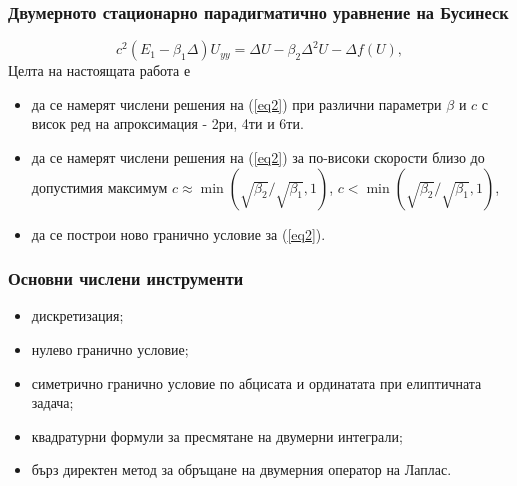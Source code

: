 \documentclass{beamer}
\newcommand{\rf}[1]{(\ref{#1})}
\begin{document}
\begin{frame}
\frametitle{ Двумерното стационарно парадигматично уравнение на Бусинеск }

\begin{equation}\label{eq2}
c^2 (E_1-\beta_1 \Delta) U_{yy} = \Delta U -\beta_2 \Delta^2 U - \Delta f(U),
\end{equation}
Целта на настоящата работа е
\begin{itemize}
  \item да се намерят числени решения на \rf{eq2} при различни параметри $\beta$ и $c$ с висок ред на апроксимация - 2ри, 4ти и 6ти.
  \item да се намерят числени решения на \rf{eq2} за по-високи скорости близо до допустимия максимум $c \approx \min (\sqrt{\beta_2}/ \sqrt{\beta_1},1)$, $c < \min (\sqrt{\beta_2}/ \sqrt{\beta_1},1)$,
  \item да се построи ново гранично условие за  \rf{eq2}.
\end{itemize}
\end{frame}


\begin{frame}
\frametitle{Основни числени инструменти } 
 
\begin{itemize}
  \item дискретизация;
  \item нулево гранично условие;
  \item симетрично гранично условие по абцисата и ординатата при елиптичната задача;
  \item квадратурни формули за пресмятане на двумерни интеграли;
  \item бърз директен метод за обръщане на двумерния оператор на Лаплас.
\end{itemize}

\end{frame}
\end{document}
